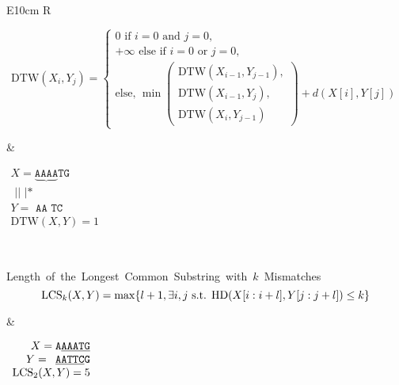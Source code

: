 \begin{table}
{\begin{tabularx}{\textwidth}{E{10cm}   R}
\begin{minipage}{10cm}
            $$ \mathrm{DTW}(X_i,Y_j)= \left\{
            \begin{array}{l}
                0 \mbox{ if } i=0 \mbox{ and } j=0 {,} \\
                +\infty \mbox{ else if } i=0 \mbox{ or } j=0 {,} \\
                \mbox{else, } \min 
                \begin{pmatrix}
                    \mathrm{DTW}(X_{i-1},Y_{j-1}), \\
                    \mathrm{DTW}(X_{i-1},Y_j), \\
                    \mathrm{DTW}(X_i,Y_{j-1})
                \end{pmatrix} + d(X[i],Y[j])
            \end{array} \right. $$
            \vspace{0.5cm}
        \end{minipage}
        &
        \hfill
        \begin{minipage}{4cm} \renewcommand{\arraystretch}{1}
            \hfill
        $\begin{array}{r}
            X= \underbrace{\mathrm{\texttt{AAAA}}}\mathrm{\texttt{TG}}\\
                \mathrm{\texttt{~||~|*}}\\
            Y= \mathrm{\texttt{~AA~TC}}\\
            \mathrm{DTW}(X,Y)=1
        \end{array}$ 
    \end{minipage}\\
    \begin{minipage}{10cm} \renewcommand{\arraystretch}{1}
        \small \mbox{Length of the Longest Common Substring with $k$ Mismatches} \\
        $$ \mathrm{LCS}_{k}(X,Y)= \max \{ l+1, \exists i,j \mbox{ s.t. } \mathrm{HD}(X[i:i+l],Y[j:j+l]) \leq k \}$$
        \end{minipage}
        &
        \hfill
        \begin{minipage}{4cm} \renewcommand{\arraystretch}{1}
            \hfill
        $\begin{array}{r}
            X= \mathrm{\texttt{A\underline{AAATG}}}\\
            Y= \mathrm{\texttt{~\underline{AATTC}G}}\\
            \mathrm{LCS}_2(X,Y)=5
        \end{array}$
        \end{minipage}\\
    \end{tabularx}
    }
    \caption{Example for various similarities, in bold those we study in this thesis. For two given strings $X$ and $Y$ and two integers $0 \leq i < |X|$ and $0 \leq j < |X|$, $X_i$ and $Y_j$ denote the prefixes of $X$ and $Y$ of length $i$ and $j$ respectively. $d(X[i],Y[j])$ is the distance between $X[i]$ and $Y[j]$ considered given as a parameter.}
    \label{fig:intro:similarities}
\end{table}
\renewcommand{\arraystretch}{1}